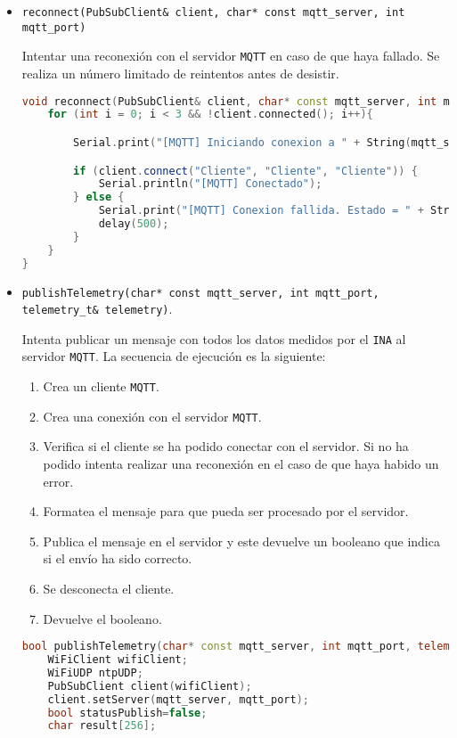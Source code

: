 \begin{itemize}

\item \texttt{reconnect(PubSubClient\& client, char* const mqtt\_server, int mqtt\_port)}

Intentar una reconexión con el servidor \texttt{MQTT} en caso de que haya fallado. Se realiza un número limitado de reintentos antes de desistir. 

\begin{lstlisting}[language=c++,caption={Función \texttt{reconnect}},captionpos=b]
void reconnect(PubSubClient& client, char* const mqtt_server, int mqtt_port) {
    for (int i = 0; i < 3 && !client.connected(); i++){

        Serial.print("[MQTT] Iniciando conexion a " + String(mqtt_server) + ":" + String(mqtt_port));

        if (client.connect("Cliente", "Cliente", "Cliente")) {
            Serial.println("[MQTT] Conectado");
        } else {
            Serial.print("[MQTT] Conexion fallida. Estado = " + String(client.state()) + ". Reintentando en 0.5 segundos...");
            delay(500);
        }
    }
}
\end{lstlisting}

\item \texttt{publishTelemetry(char* const mqtt\_server, int mqtt\_port, telemetry\_t\& telemetry)}. 

Intenta publicar un mensaje con todos los datos medidos por el \texttt{INA} al servidor \texttt{MQTT}.  La secuencia de ejecución es la siguiente:
\begin{enumerate}
    \item Crea un cliente \texttt{MQTT}.
    \item Crea una conexión con el servidor \texttt{MQTT}.
    \item Verifica si el cliente se ha podido conectar con el servidor. Si no ha podido intenta realizar una reconexión en el caso de que haya habido un error.
    \item Formatea el mensaje para que pueda ser procesado por el servidor.
    \item Publica el mensaje en el servidor y este devuelve un booleano que indica si el envío ha sido correcto.
    \item Se desconecta el cliente.
    \item Devuelve el booleano.
\end{enumerate}

\begin{lstlisting}[language=c++,caption={Funcion \texttt{publishTelemetry}},captionpos=b]
bool publishTelemetry(char* const mqtt_server, int mqtt_port, telemetry_t& telemetry){
    WiFiClient wifiClient;
    WiFiUDP ntpUDP;
    PubSubClient client(wifiClient);
    client.setServer(mqtt_server, mqtt_port);
    bool statusPublish=false;
    char result[256];


\end{lstlisting}
\end{itemize}
